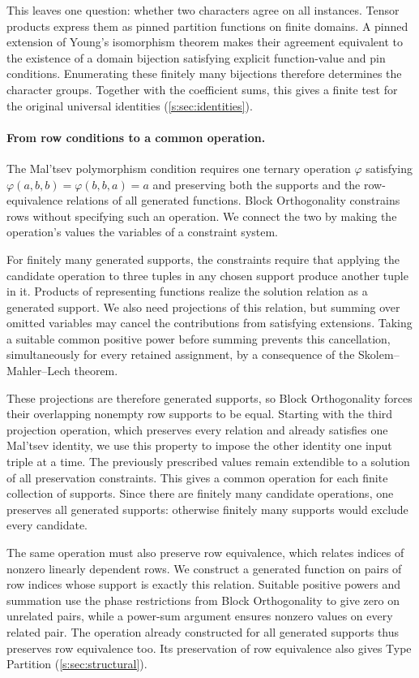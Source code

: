 \documentclass[11pt,letterpaper,onecolumn]{article}
\theoremstyle{plain}
\theoremstyle{definition}
\theoremstyle{remark}
\begin{document}
This leaves one question: whether two characters agree on all instances.
Tensor products express them as pinned partition functions on finite
domains. A pinned extension of Young's isomorphism theorem makes their
agreement equivalent to the existence of a domain bijection satisfying
explicit function-value and pin conditions. Enumerating these finitely
many bijections therefore determines the character groups. Together
with the coefficient sums, this gives a finite test for the original
universal identities (\cref{s:sec:identities}).

\paragraph{From row conditions to a common operation.}
The Mal'tsev polymorphism condition requires one ternary operation
$\varphi$ satisfying $\varphi(a,b,b)=\varphi(b,b,a)=a$ and preserving
both the supports and the row-equivalence relations of all generated
functions. Block Orthogonality constrains rows without specifying such
an operation. We connect the two by making the operation's values the
variables of a constraint system.

For finitely many generated supports, the constraints require that
applying the candidate operation to three tuples in any chosen support
produce another tuple in it. Products of representing functions realize
the solution relation as a generated support. We also need projections
of this relation, but summing over omitted variables may cancel the
contributions from satisfying extensions. Taking a suitable common
positive power before summing prevents this cancellation, simultaneously
for every retained assignment, by a consequence of the
Skolem--Mahler--Lech theorem.

These projections are therefore generated supports, so Block
Orthogonality forces their overlapping nonempty row supports to be
equal. Starting with the third projection operation, which preserves every
relation and already satisfies one Mal'tsev identity, we use this
property to impose the other identity one input triple at a time.
The previously prescribed values remain extendible to a solution of
all preservation constraints. This gives a common operation for each
finite collection of supports. Since there are finitely many candidate
operations, one preserves all generated supports: otherwise finitely
many supports would exclude every candidate.

The same operation must also preserve row equivalence, which relates
indices of nonzero linearly dependent rows. We construct a generated
function on pairs of row indices whose support is exactly this relation.
Suitable positive powers and summation use the phase restrictions from
Block Orthogonality to give zero on unrelated pairs, while a power-sum
argument ensures nonzero values on every related pair. The operation
already constructed for all generated supports thus preserves row
equivalence too. Its preservation of row equivalence also gives Type
Partition (\cref{s:sec:structural}).
\end{document}

